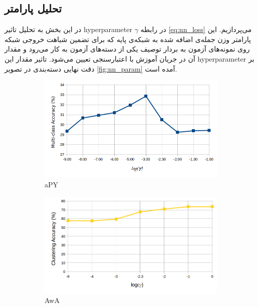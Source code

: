 \subsection{تحلیل پارامتر}\label{exp:nn_params}
در این بخش به تحلیل تاثیر \gls{hyperparameter} $\gamma$ در رابطه \eqref{eq:nn_loss} می‌پردازیم. این پارامتر وزن جمله‌ی اضافه شده به شبکه‌ی پایه که برای تضمین شباهت خروجی شبکه روی نمونه‌های آزمون به بردار توصیف یکی از دسته‌های آزمون به کار می‌رود و مقدار آن  در جریان آموزش با اعتبارسنجی تعیین می‌شود. تاثیر مقدار این \gls{hyperparameter} بر دقت نهایی دسته‌بندی در تصویر
\ref{fig:nn_param}
آمده است.
\begin{figure}[!th]
\centering
\begin{subfigure}[b]{0.43\linewidth}
    \includegraphics[width=\linewidth]{images/nn_param_apy}
    \caption{aPY}
\end{subfigure}
%
\begin{subfigure}[b]{0.43\linewidth}
    \includegraphics[width=\linewidth]{images/nn_gamma_awa}
    \caption{AwA}
\end{subfigure}
%
\begin{subfigure}[b]{0.43\linewidth}

\end{subfigure}
\end{figure}
